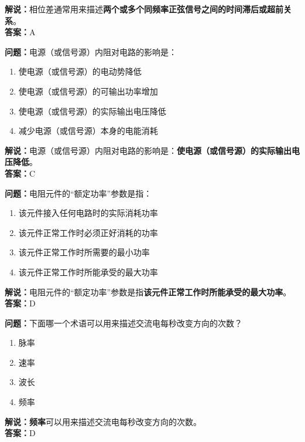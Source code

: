 \textbf{解说：}相位差通常用来描述\textbf{两个或多个同频率正弦信号之间的时间滞后或超前关系}。\\\textbf{答案：}A



\textbf{问题：}电源（或信号源）内阻对电路的影响是：

\begin{enumerate}[label=\Alph*), leftmargin=1.5cm]
	\item 使电源（或信号源）的电动势降低
	\item 使电源（或信号源）的可输出功率增加
	\item 使电源（或信号源）的实际输出电压降低
	\item 减少电源（或信号源）本身的电能消耗
\end{enumerate}

\textbf{解说：}电源（或信号源）内阻对电路的影响是：\textbf{使电源（或信号源）的实际输出电压降低}。\\\textbf{答案：}C



\textbf{问题：}电阻元件的“额定功率”参数是指：

\begin{enumerate}[label=\Alph*), leftmargin=1.5cm]
	\item 该元件接入任何电路时的实际消耗功率
	\item 该元件正常工作时必须正好消耗的功率
	\item 该元件正常工作时所需要的最小功率
	\item 该元件正常工作时所能承受的最大功率
\end{enumerate}

\textbf{解说：}电阻元件的“额定功率”参数是指\textbf{该元件正常工作时所能承受的最大功率}。\\\textbf{答案：}D




\textbf{问题：}下面哪一个术语可以用来描述交流电每秒改变方向的次数？

\begin{enumerate}[label=\Alph*), leftmargin=1.5cm]
	\item 脉率
	\item 速率
	\item 波长
	\item 频率
\end{enumerate}

\textbf{解说：}\textbf{频率}可以用来描述交流电每秒改变方向的次数。\\\textbf{答案：}D




